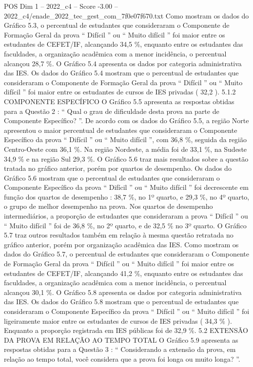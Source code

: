 \begin{textsample}{POS Dim 1 – 2022\_c4 – Score -3.00 – 2022\_c4/enade\_2022\_tec\_gest\_com\_7f0e07f670.txt}
Como mostram os dados do Gráfico 5.3, o percentual de estudantes que consideraram o Componente de Formação Geral da prova “ Difícil ” ou “ Muito difícil ” foi maior entre os estudantes de CEFET/IF, alcançando 34,5 \%, enquanto entre os estudantes das faculdades, a organização acadêmica com a menor incidência, o percentual alcançou 28,7 \%.
O Gráfico 5.4 apresenta os dados por categoria administrativa das IES.
Os dados do Gráfico 5.4 mostram que o percentual de estudantes que consideraram o Componente de Formação Geral da prova “ Difícil ” ou “ Muito difícil ” foi maior entre os estudantes de cursos de IES privadas ( 32,2 ). 5.1.2 COMPONENTE ESPECÍFICO O Gráfico 5.5 apresenta as respostas obtidas para a Questão 2 : “ Qual o grau de dificuldade desta prova na parte de Componente Específico? ”.
De acordo com os dados do Gráfico 5.5, a região Norte apresentou o maior percentual de estudantes que consideraram o Componente Específico da prova “ Difícil ” ou “ Muito difícil ”, com 36,8 \%, seguida da região Centro-Oeste com 36,1 \%.
Na região Nordeste, a média foi de 33,1 \%, na Sudeste 34,9 \% e na região Sul 29,3 \%.
O Gráfico 5.6 traz mais resultados sobre a questão tratada no gráfico anterior, porém por quartos de desempenho.
Os dados do Gráfico 5.6 mostram que o percentual de estudantes que consideraram o Componente Específico da prova “ Difícil ” ou “ Muito difícil ” foi decrescente em função dos quartos de desempenho : 38,7 \%, no 1º quarto, e 29,3 \%, no 4º quarto, o grupo de melhor desempenho na prova.
Nos quartos de desempenho intermediários, a proporção de estudantes que consideraram a prova “ Difícil ” ou “ Muito difícil ” foi de 36,8 \%, no 2º quarto, e de 32,5 \% no 3º quarto.
O Gráfico 5.7 traz outros resultados também em relação à mesma questão retratada no gráfico anterior, porém por organização acadêmica das IES.
Como mostram os dados do Gráfico 5.7, o percentual de estudantes que consideraram o Componente de Formação Geral da prova “ Difícil ” ou “ Muito difícil ” foi maior entre os estudantes de CEFET/IF, alcançando 41,2 \%, enquanto entre os estudantes das faculdades, a organização acadêmica com a menor incidência, o percentual alcançou 30,1 \%.
O Gráfico 5.8 apresenta os dados por categoria administrativa das IES.
Os dados do Gráfico 5.8 mostram que o percentual de estudantes que consideraram o Componente Específico da prova “ Difícil ” ou “ Muito difícil ” foi ligeiramente maior entre os estudantes de cursos de IES privadas ( 34,3 \% ).
Enquanto a proporção registrada em IES públicas foi de 32,9 \%. 5.2 EXTENSÃO DA PROVA EM RELAÇÃO AO TEMPO TOTAL O Gráfico 5.9 apresenta as respostas obtidas para a Questão 3 : “ Considerando a extensão da prova, em relação ao tempo total, você considera que a prova foi longa ou muito longa? ”.

\end{textsample}
